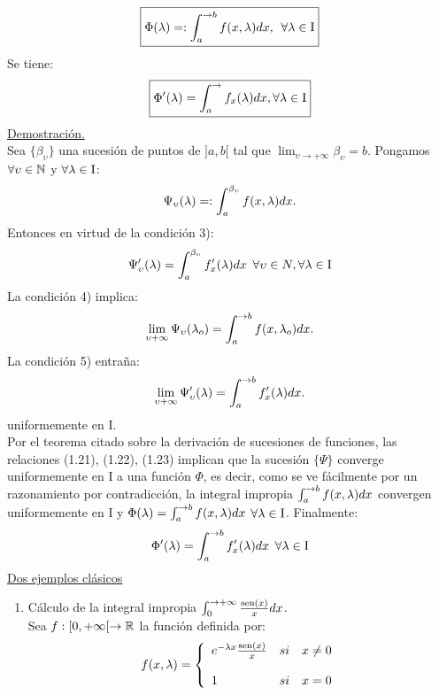 \begin{equation*}
\boxed{\Phi (\lambda)=: \int_a^{\to b}f(x,\lambda) dx, \phantom{s} \forall \lambda \in \mathrm{I}}
\end{equation*}
Se tiene:
\begin{equation*}
\boxed{\Phi '(\lambda)= \int_{a}^{\to}f_x(\lambda)dx, \forall \lambda \in \mathrm{I}}
\end{equation*}
\underline{Demostración.} \\
Sea $\lbrace \beta_\upsilon \rbrace$ una sucesión de puntos de $]a,b[$ tal que $\lim_{\upsilon \to +\infty}\beta_\upsilon=b$. Pongamos $\forall \upsilon \in \mathbb{N}$ y $\forall \lambda \in \mathrm{I}$:
$$
\Psi_\upsilon (\lambda)=:\int_a^{\beta_\upsilon}f(x,\lambda) dx.
$$
Entonces en virtud de la condición 3):
\begin{equation}
\Psi_\upsilon' (\lambda)=\int_a^{\beta_\upsilon}f'_x(\lambda)dx \phantom{s} \forall \upsilon \in N,  \forall \lambda \in \mathrm{I}
\end{equation}
La condición 4) implica:
\begin{equation}
\lim_{\upsilon +\infty}\Psi_\upsilon (\lambda_o)=\int_a^{\to b}f(x,\lambda_o)dx.
\end{equation}
La condición 5) entraña:
\begin{equation}
\lim_{\upsilon +\infty}\Psi_\upsilon' (\lambda)=\int_a^{\to b}f_x'(\lambda)dx.
\end{equation}
uniformemente en $\mathrm{I}$.\\
Por el teorema citado sobre la derivación de sucesiones de funciones, las relaciones (1.21), (1.22), (1.23) implican que la sucesión $\lbrace \Psi \rbrace$ converge uniformemente en $\mathrm{I}$ a una función $\Phi$, es decir, como se ve fácilmente por un razonamiento por contradicción, la integral impropia $\int_a^{\to  b}f(x,\lambda) dx$ convergen uniformemente en $\mathrm{I}$ y $\Phi (\lambda)=\int_a^{\to b}f(x,\lambda) dx$ $\forall \lambda \in \mathrm{I}$. Finalmente: \\
$$
\Phi ' (\lambda)=\int_a^{\to b}f'_x(\lambda)dx \phantom{s} \forall \lambda \in \mathrm{I}
$$
\underline{Dos ejemplos clásicos} \\
\begin{enumerate}[1)]
\item Cálculo de la integral impropia $\int_0^{\to +\infty}\frac{\operatorname{sen} (x)}{x}dx$. \\
Sea $f:[0,+\infty[ \rightarrow \mathbb{R}$ la función definida por: \\

\begin{equation*}
f(x,\lambda)= \left\{ \begin{array}{lcc}
            e^{-\lambda x}\frac{\operatorname{sen} (x)}{x} &   si  & x \neq 0 \\
             \\  1 &  si &  x=0 \\
             \end{array}
   \right.
\end{equation*}
\end{enumerate}
